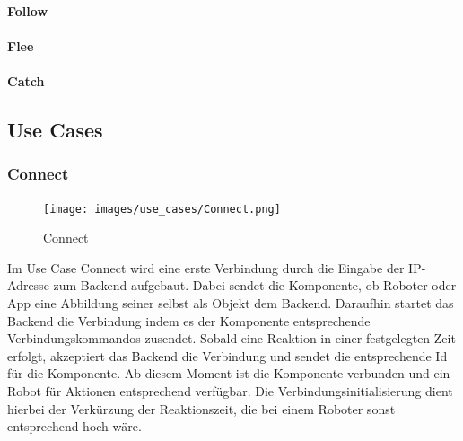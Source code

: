 \paragraph{Follow}
\paragraph{Flee}
\paragraph{Catch}

\subsection{Use Cases}
\subsubsection{Connect}

\begin{figure}[h]
	\begin{center}
		\texttt{[image: images/use\_cases/Connect.png]}
	\end{center}
	\caption{Connect}
	\label{fig:UC_Connect}
\end{figure}

\noindent
Im Use Case Connect wird eine erste Verbindung durch die Eingabe der IP-Adresse zum Backend aufgebaut. Dabei sendet die Komponente, ob Roboter oder App eine Abbildung seiner selbst als Objekt dem Backend. Daraufhin startet das Backend die Verbindung indem es der Komponente entsprechende Verbindungskommandos zusendet. Sobald eine Reaktion in einer festgelegten Zeit erfolgt, akzeptiert das Backend die Verbindung und sendet die entsprechende Id für die Komponente. Ab diesem Moment ist die Komponente verbunden und ein Robot für Aktionen entsprechend verfügbar. Die Verbindungsinitialisierung dient hierbei der Verkürzung der Reaktionszeit, die bei einem Roboter sonst entsprechend hoch wäre.

